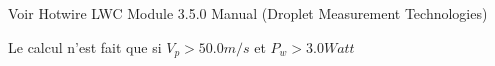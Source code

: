 
Voir Hotwire LWC Module 3.5.0 Manual (Droplet Measurement Technologies)

Le calcul n'est fait que si $V_p > 50.0 m/s$ et
$P_w > 3.0 Watt $
